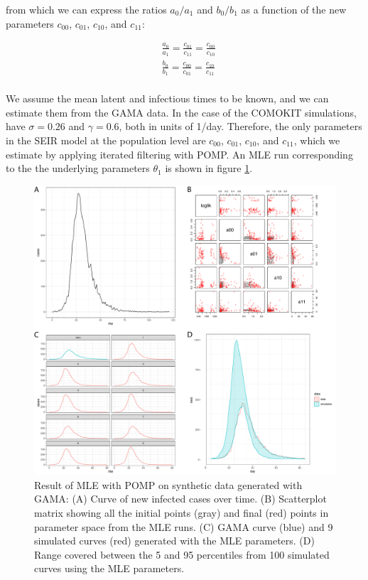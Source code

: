 \documentclass{article}
\begin{document}
from which we can express the ratios $a_0/a_1$ and $b_0/b_1$ as a function of the new parameters $c_{00}$, $c_{01}$, $c_{10}$, and $c_{11}$:

\begin{equation}
\begin{aligned}
& \frac{a_0}{a_1} = \frac{c_{01}}{c_{11}} = \frac{c_{00}}{c_{10}} \\
& \frac{b_0}{b_1} = \frac{c_{00}}{c_{01}} = \frac{c_{10}}{c_{11}} \\
\end{aligned}
\label{eq:eq2}
\end{equation}

We assume the mean latent and infectious times to be known, and we can estimate them from the GAMA data. In the case of the COMOKIT simulations, have $\sigma=0.26$ and $\gamma=0.6$, both in units of 1/day. Therefore, the only parameters in the SEIR model at the population level are $c_{00}$, $c_{01}$, $c_{10}$, and $c_{11}$, which we estimate by applying iterated filtering with POMP. An MLE run corresponding to the the underlying parameters $\theta_1$ is shown in figure \ref{fig:fig1}.

\begin{figure} %
  \centering
  \includegraphics[scale=0.4]{Figure-1.pdf}
  \caption{Result of MLE with POMP on synthetic data generated with GAMA: (A) Curve of new infected cases over time. (B) Scatterplot matrix showing all the initial points (gray) and final (red) points in parameter space from the MLE runs. (C) GAMA curve (blue) and 9 simulated curves (red) generated with the MLE parameters. (D) Range covered between the 5 and 95 percentiles from 100 simulated curves using the MLE parameters. }
  \label{fig:fig1}
\end{figure}
\end{document}
